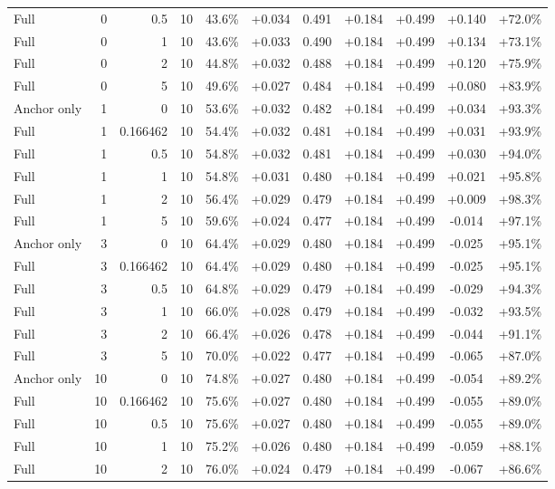 \begin{table}[htbp]
\begin{tabular}{lrrrccccccc}
Full & 0 & 0.5 & 10 & 43.6\% & +0.034 & 0.491 & +0.184 & +0.499 & +0.140 & +72.0\% \\
Full & 0 & 1 & 10 & 43.6\% & +0.033 & 0.490 & +0.184 & +0.499 & +0.134 & +73.1\% \\
Full & 0 & 2 & 10 & 44.8\% & +0.032 & 0.488 & +0.184 & +0.499 & +0.120 & +75.9\% \\
Full & 0 & 5 & 10 & 49.6\% & +0.027 & 0.484 & +0.184 & +0.499 & +0.080 & +83.9\% \\
Anchor only & 1 & 0 & 10 & 53.6\% & +0.032 & 0.482 & +0.184 & +0.499 & +0.034 & +93.3\% \\
Full & 1 & 0.166462 & 10 & 54.4\% & +0.032 & 0.481 & +0.184 & +0.499 & +0.031 & +93.9\% \\
Full & 1 & 0.5 & 10 & 54.8\% & +0.032 & 0.481 & +0.184 & +0.499 & +0.030 & +94.0\% \\
Full & 1 & 1 & 10 & 54.8\% & +0.031 & 0.480 & +0.184 & +0.499 & +0.021 & +95.8\% \\
Full & 1 & 2 & 10 & 56.4\% & +0.029 & 0.479 & +0.184 & +0.499 & +0.009 & +98.3\% \\
Full & 1 & 5 & 10 & 59.6\% & +0.024 & 0.477 & +0.184 & +0.499 & -0.014 & +97.1\% \\
Anchor only & 3 & 0 & 10 & 64.4\% & +0.029 & 0.480 & +0.184 & +0.499 & -0.025 & +95.1\% \\
Full & 3 & 0.166462 & 10 & 64.4\% & +0.029 & 0.480 & +0.184 & +0.499 & -0.025 & +95.1\% \\
Full & 3 & 0.5 & 10 & 64.8\% & +0.029 & 0.479 & +0.184 & +0.499 & -0.029 & +94.3\% \\
Full & 3 & 1 & 10 & 66.0\% & +0.028 & 0.479 & +0.184 & +0.499 & -0.032 & +93.5\% \\
Full & 3 & 2 & 10 & 66.4\% & +0.026 & 0.478 & +0.184 & +0.499 & -0.044 & +91.1\% \\
Full & 3 & 5 & 10 & 70.0\% & +0.022 & 0.477 & +0.184 & +0.499 & -0.065 & +87.0\% \\
Anchor only & 10 & 0 & 10 & 74.8\% & +0.027 & 0.480 & +0.184 & +0.499 & -0.054 & +89.2\% \\
Full & 10 & 0.166462 & 10 & 75.6\% & +0.027 & 0.480 & +0.184 & +0.499 & -0.055 & +89.0\% \\
Full & 10 & 0.5 & 10 & 75.6\% & +0.027 & 0.480 & +0.184 & +0.499 & -0.055 & +89.0\% \\
Full & 10 & 1 & 10 & 75.2\% & +0.026 & 0.480 & +0.184 & +0.499 & -0.059 & +88.1\% \\
Full & 10 & 2 & 10 & 76.0\% & +0.024 & 0.479 & +0.184 & +0.499 & -0.067 & +86.6\% \\

\end{tabular}
\end{table}
